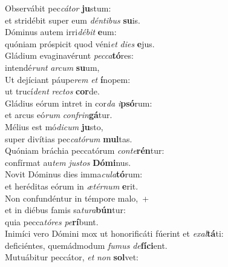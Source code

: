 \evenverse Observábit pec\textit{cá}\textit{tor} \textbf{ju}stum:~\*\\
\evenverse et stridébit super eum \textit{dén}\textit{ti}\textit{bus} \textbf{su}is.\\
\oddverse Dóminus autem irri\textit{dé}\textit{bit} \textbf{e}um:~\*\\
\oddverse quóniam próspicit quod véni\textit{et} \textit{di}\textit{es} \textbf{e}jus.\\
\evenverse Gládium evaginavérunt \textit{pec}\textit{ca}\textbf{tó}res:~\*\\
\evenverse intendé\textit{runt} \textit{ar}\textit{cum} \textbf{su}um,\\
\oddverse Ut dejíciant páupe\textit{rem} \textit{et} \textbf{í}nopem:~\*\\
\oddverse ut trucí\textit{dent} \textit{re}\textit{ctos} \textbf{cor}de.\\
\evenverse Gládius eórum intret in cor\textit{da} \textit{i}\textbf{psó}rum:~\*\\
\evenverse et arcus eó\textit{rum} \textit{con}\textit{frin}\textbf{gá}tur.\\
\oddverse Mélius est mó\textit{di}\textit{cum} \textbf{ju}sto,~\*\\
\oddverse super divítias pec\textit{ca}\textit{tó}\textit{rum} \textbf{mul}tas.\\
\evenverse Quóniam bráchia peccatórum \textit{con}\textit{te}\textbf{rén}tur:~\*\\
\evenverse confírmat au\textit{tem} \textit{ju}\textit{stos} \textbf{Dó}\textbf{mi}nus.\\
\oddverse Novit Dóminus dies imma\textit{cu}\textit{la}\textbf{tó}rum:~\*\\
\oddverse et heréditas eórum in \textit{æ}\textit{tér}\textit{num} \textbf{e}rit.\\
\evenverse Non confundéntur in témpore malo,~+\\
\evenverse  et in diébus famis sa\textit{tu}\textit{ra}\textbf{bún}tur:~\*\\
\evenverse quia pecca\textit{tó}\textit{res} \textit{pe}\textbf{rí}bunt.\\
\oddverse Inimíci vero Dómini mox ut honorificáti fúerint et \textit{e}\textit{xal}\textbf{tá}ti:~\*\\
\oddverse deficiéntes, quemádmodum \textit{fu}\textit{mus} \textit{de}\textbf{fí}\textbf{ci}ent.\\
\evenverse Mutuábitur peccátor, \textit{et} \textit{non} \textbf{sol}vet:~\*\\
